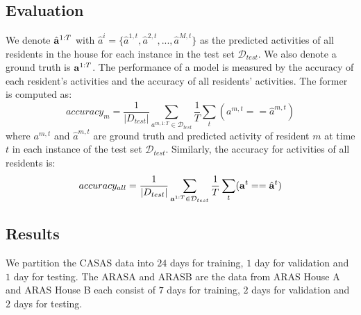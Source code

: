 \subsection{Evaluation}
We denote $\hat{\mathbf{a}}^{1:T}$ with $\hat{a}^{i}=\{\hat{a}^{1,t},
\hat{a}^{2,t}, ..., \hat{a}^{M,t}\}$ as the predicted activities of
all residents in the house for each instance in the test set
$\mathcal{D}_{test}$. We also denote a ground truth is
$\mathbf{a}^{1:T}$. The performance of a model is measured by the accuracy
of each resident's activities and the accuracy of all residents'
activities. The former is computed as:
\begin{equation}
  accuracy_m = \frac{1}{|D_{test}|}\sum_{a^{m,1:T} \in \mathcal{D}_{test}}\frac{1}{T} \sum_t(a^{m,t}==\hat{a}^{m,t})
\end{equation}
where $a^{m,t}$ and $\hat{a}^{m,t}$ are ground truth and predicted activity of resident $m$ at time $t$ in each instance of the test set $\mathcal{D}_{test}$. Similarly, the accuracy for activities of all residents is:
\begin{equation}
  accuracy_{all} = \frac{1}{|D_{test}|}\sum_{\mathbf{a}^{1:T} \in \mathcal{D}_{test}}\frac{1}{T} \sum_t(\mathbf{a}^{t}==\hat{\mathbf{a}}^{t})
\end{equation}
\subsection{Results}
\label{sec:results}
We partition the CASAS data into $24$ days for training, $1$ day for validation and $1$ day for testing. The ARASA and ARASB are the data from ARAS House A and ARAS House B each consist of $7$ days for training, $2$ days for validation and $2$ days for testing.

